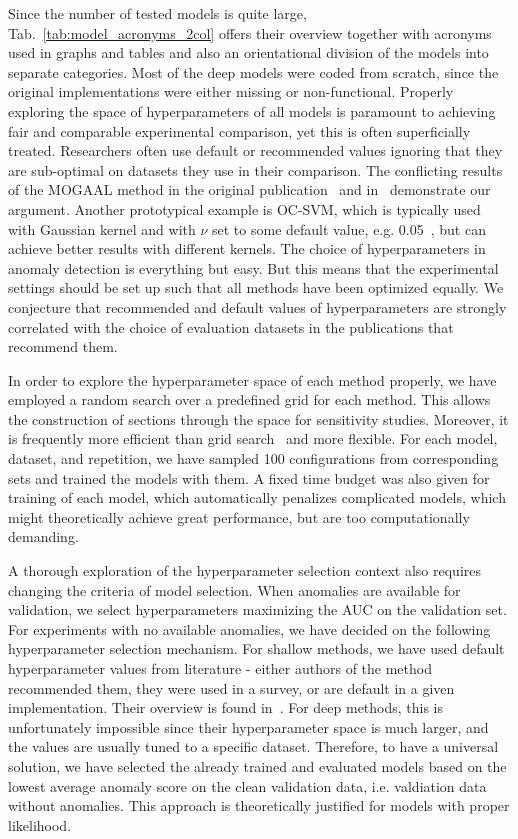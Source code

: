 Since the number of tested models is quite large, Tab.~\ref{tab:model_acronyms_2col} offers their overview together with acronyms used in graphs and tables and also an orientational division of the models into separate categories. Most of the deep models were coded from scratch, since the original implementations were either missing or non-functional. Properly exploring the space of hyperparameters of all models is paramount to achieving fair and comparable experimental comparison, yet this is often superficially treated. Researchers often use default or recommended values ignoring that they are sub-optimal on datasets they use in their comparison. The conflicting results of the MOGAAL method in the original publication~\cite{liu2019generative} and in~\cite{wang2020advae} demonstrate our argument. Another prototypical example is OC-SVM, which is typically used with Gaussian kernel and with $\nu$ set to some default value, e.g. 0.05~\cite{pevny2016loda}, but can achieve better results with different kernels. The choice of hyperparameters in anomaly detection is everything but easy. But this means that the experimental settings should be set up such that all methods have been optimized equally. We conjecture that recommended and default values of hyperparameters are strongly correlated with the choice of evaluation datasets in the publications that recommend them.

In order to explore the hyperparameter space of each method properly, we have employed a random search over a predefined grid for each method. This allows the construction of sections through the space for sensitivity studies. Moreover, it is frequently more efficient than grid search~\cite{bergstra2012random} and more flexible. For each model, dataset, and repetition, we have sampled 100 configurations from corresponding sets and trained the models with them. A fixed time budget was also given for training of each model, which automatically penalizes complicated models, which might theoretically achieve great performance, but are too computationally demanding.

A thorough exploration of the hyperparameter selection context also requires changing the criteria of model selection. When anomalies are available for validation, we select hyperparameters maximizing the AUC on the validation set. For experiments with no available anomalies, we have decided on the following hyperparameter selection mechanism. For shallow methods, we have used default hyperparameter values from literature - either authors of the method recommended them, they were used in a survey, or are default in a given implementation. Their overview is found in~\cite{vskvara2021comparison}. For deep methods, this is unfortunately impossible since their hyperparameter space is much larger, and the values are usually tuned to a specific dataset. Therefore, to have a universal solution, we have selected the already trained and evaluated models based on the lowest average anomaly score on the clean validation data, i.e. valdiation data without anomalies. This approach is theoretically justified for models with proper likelihood. 

